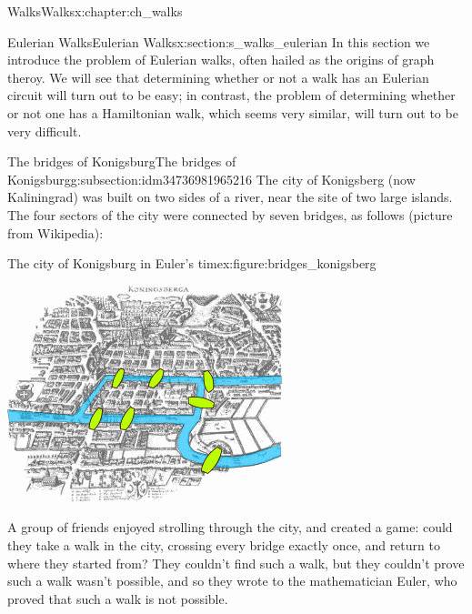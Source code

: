 \documentclass[oneside,10pt,]{book}
\numberwithin{equation}{section}
\begin{document}
\begin{chapterptx}{Walks}{}{Walks}{}{}{x:chapter:ch_walks}
\begin{sectionptx}{Eulerian Walks}{}{Eulerian Walks}{}{}{x:section:s_walks_eulerian}
In this section we introduce the problem of Eulerian walks, often hailed as the origins of graph theroy. We will see that determining whether or not a walk has an Eulerian circuit will turn out to be easy; in contrast, the problem of determining whether or not one has a Hamiltonian walk, which seems very similar, will turn out to be very difficult.%
%
%
\typeout{************************************************}
\typeout{************************************************}
%
\begin{subsectionptx}{The bridges of Konigsburg}{}{The bridges of Konigsburg}{}{}{g:subsection:idm34736981965216}
The city of Konigsberg (now Kaliningrad) was built on two sides of a river, near the site of two large islands.   The four sectors of the city were connected by seven bridges, as follows (picture from Wikipedia):%
\begin{figureptx}{The city of Konigsburg in Euler's time}{x:figure:bridges_konigsberg}{}%
\begin{image}{0.15}{0.7}{0.15}%
\includegraphics[width=\linewidth]{images/Konigsberg_bridges.png}
\end{image}%
\tcblower
\end{figureptx}%
A group of friends enjoyed strolling through the city, and created a game: could they take a walk in the city, crossing every bridge exactly once, and return to where they started from? They couldn't find such a walk, but they couldn't prove such a walk wasn't possible, and so they wrote to the mathematician Euler, who proved that such a walk is not possible.%

\end{subsectionptx}
\end{sectionptx}
\end{chapterptx}
\end{document}
